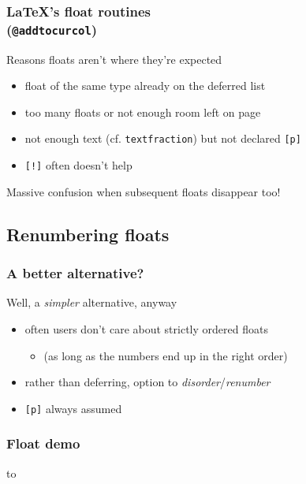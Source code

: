 \documentclass{beamer}
\def\cs#1{\texttt{\expandafter\string\csname#1\endcsname}}
\begin{document}
\begin{frame}
  \frametitle{\LaTeX's float routines\\\normalsize(\cs{@addtocurcol})}
  \begin{block}{Reasons floats aren't where they're expected}
    \begin{itemize}
    \item float of the same type already on the deferred list
    \item too many floats or not enough room left on page
    \item not enough text (cf. \cs{textfraction}) but not declared \texttt{[p]}
    \item \texttt{[!]} often doesn't help
    \end{itemize}
  \end{block}
  \vskip 2pc
  Massive confusion when subsequent floats disappear too!
\end{frame}

\subsection{Renumbering floats}
\begin{frame}
  \frametitle{A better alternative?}
  \begin{block}{Well, a \emph{simpler} alternative, anyway}
    \begin{itemize}
    \item often users don't care about strictly ordered floats
      \begin{itemize}
      \item (as long as the numbers end up in the right order)
      \end{itemize}
    \item rather than deferring, option to \emph{disorder}/\emph{renumber}
    \item \texttt{[p]} always assumed
    \end{itemize}
  \end{block}
\end{frame}

\begin{frame}
  \frametitle{Float demo}
  \hbox to \textwidth{\hfill\Huge$\Rightarrow$\hfill}
\end{frame}
\end{document}
